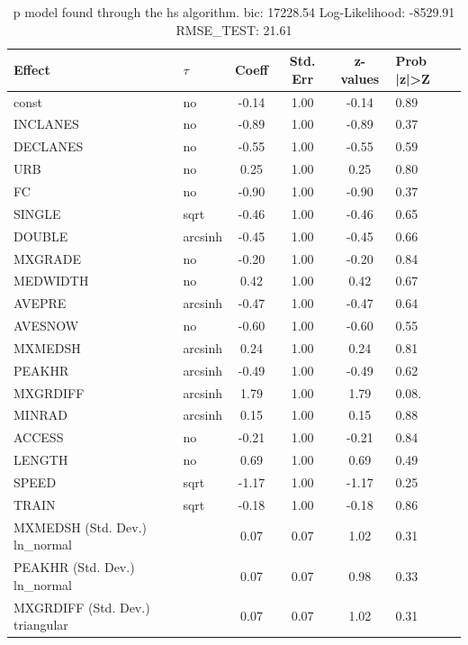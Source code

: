 \begin{table}
	\caption{p model found through the hs algorithm. bic: 17228.54 Log-Likelihood: -8529.91 RMSE_TEST: 21.61}
	\begin{center}
		\begin{tabular}{|l|l|c|c|c|l|}
			\hline
			Effect & $\tau$ & Coeff & Std. Err & z-values & Prob |z|>Z \\
			\hline
			const & no & -0.14 & 1.00 & -0.14 & 0.89 \\
			\hline
			INCLANES & no & -0.89 & 1.00 & -0.89 & 0.37 \\
			\hline
			DECLANES & no & -0.55 & 1.00 & -0.55 & 0.59 \\
			\hline
			URB & no & 0.25 & 1.00 & 0.25 & 0.80 \\
			\hline
			FC & no & -0.90 & 1.00 & -0.90 & 0.37 \\
			\hline
			SINGLE & sqrt & -0.46 & 1.00 & -0.46 & 0.65 \\
			\hline
			DOUBLE & arcsinh & -0.45 & 1.00 & -0.45 & 0.66 \\
			\hline
			MXGRADE & no & -0.20 & 1.00 & -0.20 & 0.84 \\
			\hline
			MEDWIDTH & no & 0.42 & 1.00 & 0.42 & 0.67 \\
			\hline
			AVEPRE & arcsinh & -0.47 & 1.00 & -0.47 & 0.64 \\
			\hline
			AVESNOW & no & -0.60 & 1.00 & -0.60 & 0.55 \\
			\hline
			MXMEDSH & arcsinh & 0.24 & 1.00 & 0.24 & 0.81 \\
			\hline
			PEAKHR & arcsinh & -0.49 & 1.00 & -0.49 & 0.62 \\
			\hline
			MXGRDIFF & arcsinh & 1.79 & 1.00 & 1.79 & 0.08. \\
			\hline
			MINRAD & arcsinh & 0.15 & 1.00 & 0.15 & 0.88 \\
			\hline
			ACCESS & no & -0.21 & 1.00 & -0.21 & 0.84 \\
			\hline
			LENGTH & no & 0.69 & 1.00 & 0.69 & 0.49 \\
			\hline
			SPEED & sqrt & -1.17 & 1.00 & -1.17 & 0.25 \\
			\hline
			TRAIN & sqrt & -0.18 & 1.00 & -0.18 & 0.86 \\
			\hline
			MXMEDSH (Std. Dev.) ln_normal &  & 0.07 & 0.07 & 1.02 & 0.31 \\
			\hline
			PEAKHR (Std. Dev.) ln_normal &  & 0.07 & 0.07 & 0.98 & 0.33 \\
			\hline
			MXGRDIFF (Std. Dev.) triangular &  & 0.07 & 0.07 & 1.02 & 0.31 \\

\end{tabular}
\end{center}
\end{table}
